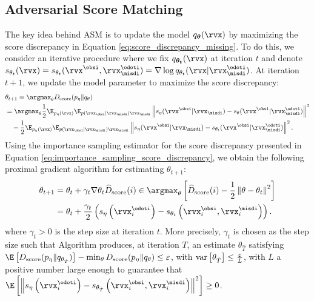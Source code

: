 \documentclass{article} %
\begin{document}
\subsection{Adversarial Score Matching}
The key idea behind ASM is to update the model $q_{\bm{\theta}}(\rvx)$ by maximizing the score discrepancy in Equation \eqref{eq:score_discrepancy_missing}. To do this, we consider an iterative procedure where we fix $q_{\bm{\theta_{t}}}(\rvx)$ at iteration $t$ and denote $s_{\theta_{t}}(\rvx) = s_{\theta_{t}}(\rvx^{\obsi}, \rvx_{\misdi}^{\odoti}) = \nabla \log q_{\theta_{t}}(\rvx | \rvx_{\misdi}^{\odoti})$. At iteration $t+1$, we update the model parameter to maximize the score discrepancy:
\begin{align}
	&\theta_{t+1} = \argmax_{\theta} D_{\text{score}}(p_{\eta} \| q_{\theta} ) \nonumber \\ 
	&= \argmax_{\theta} \frac{1}{2} \E_{p_{\eta}(\rvx)} \E_{p(\rvx_{\obsi} | \rvx_{\misdi}) \rvx_{\misdi}} \left\| s_{\eta}(\rvx^{\obsi} | \rvx_{\misdi}) - s_{\theta} (\rvx^{\obsi} | \rvx_{\misdi}^{\odoti}) \right\|^{2} \notag \\
	& \quad - \frac{1}{2} \E_{p_{\eta}(\rvx)} \E_{p(\rvx_{\obsi} | \rvx_{\misdi}) \rvx_{\misdi}} \left\| s_{\eta}(\rvx^{\obsi} | \rvx_{\misdi}) - s_{\theta_{t}}(\rvx^{\obsi} | \rvx_{\misdi}^{\odoti}) \right\|^{2}. \label{eq:update_eq}
\end{align}
Using the importance sampling estimator for the score discrepancy presented in Equation \eqref{eq:importance_sampling_score_discrepancy}, we obtain the following proximal gradient algorithm \citep{Beck2017} for estimating $\theta_{t+1}$:
\begin{align}
	\theta_{t+1} &= \theta_{t} + \gamma_{t} \nabla \theta_{t} \widehat{D}_{\text{score}}(i) \in \argmax_{\theta} \left[ \widehat{D}_{\text{score}}(i) - \frac{1}{2} \left\| \theta - \theta_{t} \right\|^{2} \right] \notag \\
	&= \theta_{t} + \frac{\gamma_{t}}{2} \left( s_{\eta}\left(\rvx_{i}^{\odoti} \right) - s_{\theta_{t}} \left( \rvx_{i}^{\obsi}, \rvx_{i}^{\misdi} \right) \right). \label{eq:proximal_gradient_algo}
\end{align}
where $\gamma_{t}>0$ is the step size at iteration $t$. More precisely, $\gamma_{t}$ is chosen as the step size such that Algorithm produces, at iteration $T$, an estimate $\theta_{\hat{T}}$ satisfying $\E \left[ D_{\text{score}}(p_{\eta} \| q_{\theta_{\hat{T}}}) \right] - \min_{\theta} D_{\text{score}}(p_{\eta} \| q_{\theta}) \leq \varepsilon$, with $\text{\rm{var}}\left[\theta_{\hat{T}}\right] \leq \frac{\varepsilon}{L}$, with $L$ a positive number large enough to guarantee that $\E \left[ \left\| s_{\eta} \left( \rvx_{i}^{\odoti} \right) - s_{\theta_{\hat{T}}} \left( \rvx_{i}^{\obsi}, \rvx_{i}^{\misdi} \right) \right\|^{2} \right] \geq 0$.
\end{document}
